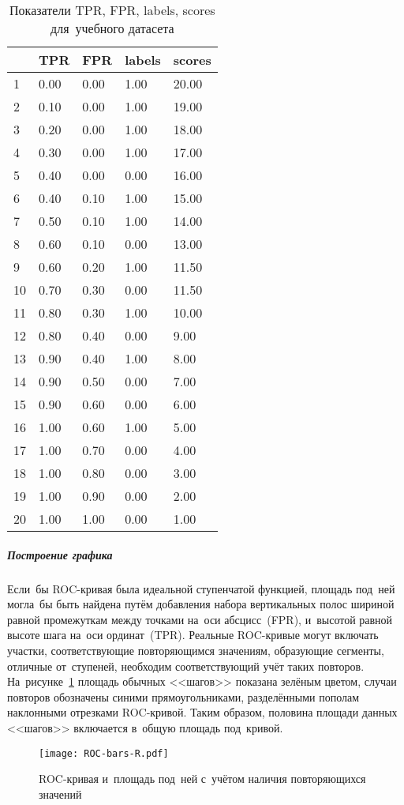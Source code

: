 \documentclass[]{scrreprt}
\begin{document}
\begin{table}[ht]
	\caption{Показатели TPR, FPR, labels, scores для~учебного датасета}\label{tab:roc_df-r}
	\centering
	\begin{tabular}{lllll}
		\hline
		& TPR & FPR & labels & scores \\ 
		\hline
		1 & 0.00 & 0.00 & 1.00 & 20.00 \\ 
		2 & 0.10 & 0.00 & 1.00 & 19.00 \\ 
		3 & 0.20 & 0.00 & 1.00 & 18.00 \\ 
		4 & 0.30 & 0.00 & 1.00 & 17.00 \\ 
		5 & 0.40 & 0.00 & 0.00 & 16.00 \\ 
		6 & 0.40 & 0.10 & 1.00 & 15.00 \\ 
		7 & 0.50 & 0.10 & 1.00 & 14.00 \\ 
		8 & 0.60 & 0.10 & 0.00 & 13.00 \\ 
		9 & 0.60 & 0.20 & 1.00 & 11.50 \\ 
		10 & 0.70 & 0.30 & 0.00 & 11.50 \\ 
		11 & 0.80 & 0.30 & 1.00 & 10.00 \\ 
		12 & 0.80 & 0.40 & 0.00 & 9.00 \\ 
		13 & 0.90 & 0.40 & 1.00 & 8.00 \\ 
		14 & 0.90 & 0.50 & 0.00 & 7.00 \\ 
		15 & 0.90 & 0.60 & 0.00 & 6.00 \\ 
		16 & 1.00 & 0.60 & 1.00 & 5.00 \\ 
		17 & 1.00 & 0.70 & 0.00 & 4.00 \\ 
		18 & 1.00 & 0.80 & 0.00 & 3.00 \\ 
		19 & 1.00 & 0.90 & 0.00 & 2.00 \\ 
		20 & 1.00 & 1.00 & 0.00 & 1.00 \\ 
		\hline
	\end{tabular}
\end{table}
%
\subparagraph{Построение графика}
Если~бы ROC-кривая была идеальной ступенчатой функцией, площадь под~ней могла~бы быть найдена путём добавления набора вертикальных полос шириной равной промежуткам между точками на~оси абсцисс~(FPR), и~высотой равной высоте шага на~оси ординат~(TPR). Реальные ROC-кривые могут включать участки, соответствующие повторяющимся значениям, образующие сегменты, отличные от~ступеней, необходим соответствующий учёт таких повторов. На~рисунке~\ref{fig:ROC-bars-R} площадь обычных <<шагов>> показана зелёным цветом, случаи повторов обозначены синими прямоугольниками, разделёнными пополам наклонными отрезками ROC-кривой. Таким образом, половина площади данных <<шагов>> включается в~общую площадь под~кривой.
%
\begin{figure}[ht]
	\centering
	\texttt{[image: ROC-bars-R.pdf]}
	\caption{ROC-кривая и~площадь под~ней с~учётом наличия повторяющихся значений}
	\label{fig:ROC-bars-R}
\end{figure}
%
\end{document}
